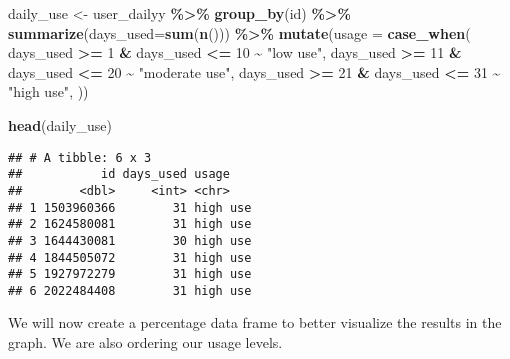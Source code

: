 \documentclass[
]{article}
\newenvironment{Shaded}{\begin{snugshade}}{\end{snugshade}}
\newcommand{\AttributeTok}[1]{\textcolor[rgb]{0.13,0.29,0.53}{#1}}
\newcommand{\DecValTok}[1]{\textcolor[rgb]{0.00,0.00,0.81}{#1}}
\newcommand{\FunctionTok}[1]{\textcolor[rgb]{0.13,0.29,0.53}{\textbf{#1}}}
\newcommand{\NormalTok}[1]{#1}
\newcommand{\OtherTok}[1]{\textcolor[rgb]{0.56,0.35,0.01}{#1}}
\newcommand{\SpecialCharTok}[1]{\textcolor[rgb]{0.81,0.36,0.00}{\textbf{#1}}}
\newcommand{\StringTok}[1]{\textcolor[rgb]{0.31,0.60,0.02}{#1}}
\begin{document}
\begin{Shaded}
\begin{Highlighting}[]
\NormalTok{daily\_use }\OtherTok{\textless{}{-}}\NormalTok{ user\_dailyy }\SpecialCharTok{\%\textgreater{}\%}
  \FunctionTok{group\_by}\NormalTok{(id) }\SpecialCharTok{\%\textgreater{}\%}
  \FunctionTok{summarize}\NormalTok{(}\AttributeTok{days\_used=}\FunctionTok{sum}\NormalTok{(}\FunctionTok{n}\NormalTok{())) }\SpecialCharTok{\%\textgreater{}\%}
  \FunctionTok{mutate}\NormalTok{(}\AttributeTok{usage =} \FunctionTok{case\_when}\NormalTok{(}
\NormalTok{    days\_used }\SpecialCharTok{\textgreater{}=} \DecValTok{1} \SpecialCharTok{\&}\NormalTok{ days\_used }\SpecialCharTok{\textless{}=} \DecValTok{10} \SpecialCharTok{\textasciitilde{}} \StringTok{"low use"}\NormalTok{,}
\NormalTok{    days\_used }\SpecialCharTok{\textgreater{}=} \DecValTok{11} \SpecialCharTok{\&}\NormalTok{ days\_used }\SpecialCharTok{\textless{}=} \DecValTok{20} \SpecialCharTok{\textasciitilde{}} \StringTok{"moderate use"}\NormalTok{, }
\NormalTok{    days\_used }\SpecialCharTok{\textgreater{}=} \DecValTok{21} \SpecialCharTok{\&}\NormalTok{ days\_used }\SpecialCharTok{\textless{}=} \DecValTok{31} \SpecialCharTok{\textasciitilde{}} \StringTok{"high use"}\NormalTok{, }
\NormalTok{  ))}
  
\FunctionTok{head}\NormalTok{(daily\_use)}
\end{Highlighting}
\end{Shaded}

\begin{verbatim}
## # A tibble: 6 x 3
##           id days_used usage   
##        <dbl>     <int> <chr>   
## 1 1503960366        31 high use
## 2 1624580081        31 high use
## 3 1644430081        30 high use
## 4 1844505072        31 high use
## 5 1927972279        31 high use
## 6 2022484408        31 high use
\end{verbatim}

We will now create a percentage data frame to better visualize the
results in the graph. We are also ordering our usage levels.
\end{document}
